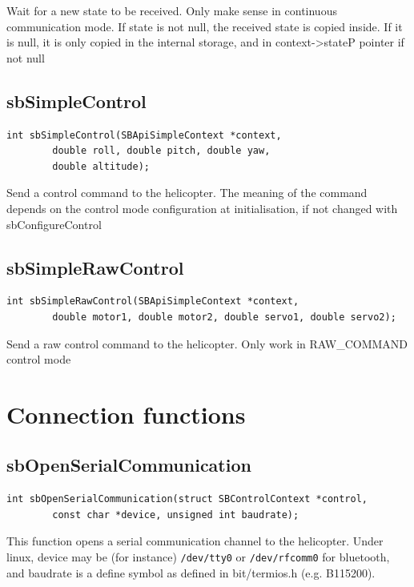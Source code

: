 \documentclass{article}
\begin{document}
Wait for a new state to be received. Only make sense in continuous 
communication mode. If state is not null, the received state is copied
inside. If it is null, it is only copied in the internal storage, and in 
context->stateP pointer if not null


\subsection{sbSimpleControl}
\label{sec:sbSimpleControl}
\begin{verbatim}
int sbSimpleControl(SBApiSimpleContext *context, 
        double roll, double pitch, double yaw,
        double altitude);
\end{verbatim}

Send a control command to the helicopter. The meaning of the command
depends on the control mode configuration at initialisation, if not changed
with sbConfigureControl


\subsection{sbSimpleRawControl}
\label{sec:sbSimpleRawControl}
\begin{verbatim}
int sbSimpleRawControl(SBApiSimpleContext *context, 
        double motor1, double motor2, double servo1, double servo2);
\end{verbatim}

Send a raw control command to the helicopter. Only work in RAW\_COMMAND
control mode



\section{Connection functions}
\label{sec:connection}
\subsection{sbOpenSerialCommunication}
\label{sec:sbOpenSerialCommunication}
\begin{verbatim}
int sbOpenSerialCommunication(struct SBControlContext *control,
        const char *device, unsigned int baudrate);
\end{verbatim}
This function opens a serial communication channel to the helicopter. 
Under linux, device may be (for instance) {\tt /dev/tty0} or {\tt /dev/rfcomm0} for
bluetooth, and baudrate is a define symbol as defined in bit/termios.h (e.g.
B115200). 
\end{document}
